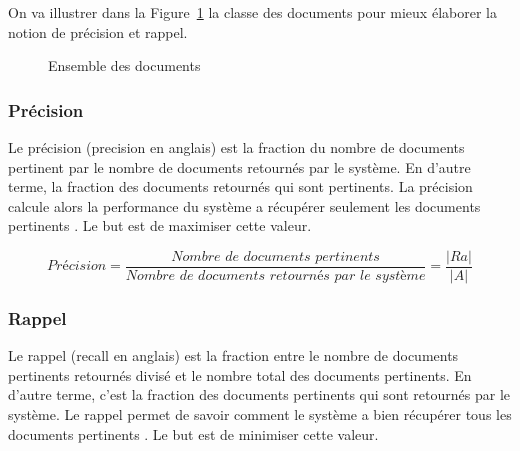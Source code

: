 On va illustrer dans la Figure~\ref{fig:precision-recall} la classe des documents pour mieux élaborer la notion de précision et rappel.
\begin{figure}[htbp]
	\begin{center}
	\end{center}
	\caption{Ensemble des documents \citep{modern-ir}}
	\label{fig:precision-recall}
\end{figure}

\subsubsection{Précision}
Le précision (precision en anglais) est la fraction du nombre de documents pertinent par le nombre de documents retournés par le système. En d'autre terme, la fraction des documents retournés qui sont pertinents. La précision calcule alors la performance du système a récupérer seulement les documents pertinents \citep*{evaluation-of-ir-system, ir-on-web,vsm-for-arabic-language}. Le but est de maximiser cette valeur.

\[
	Précision = \frac{\textit{Nombre de documents pertinents}}{\textit{Nombre de documents retournés par le système}} = \frac{|Ra|}{|A|}
\]

\subsubsection{Rappel}
Le rappel (recall en anglais) est la fraction entre le nombre de documents pertinents retournés divisé et le nombre total des documents pertinents. En d'autre terme, c'est la fraction des documents pertinents qui sont retournés par le système. Le rappel permet de savoir comment le système a bien récupérer tous les documents pertinents \citep*{evaluation-of-ir-system, ir-on-web,vsm-for-arabic-language}. Le but est de minimiser cette valeur.

